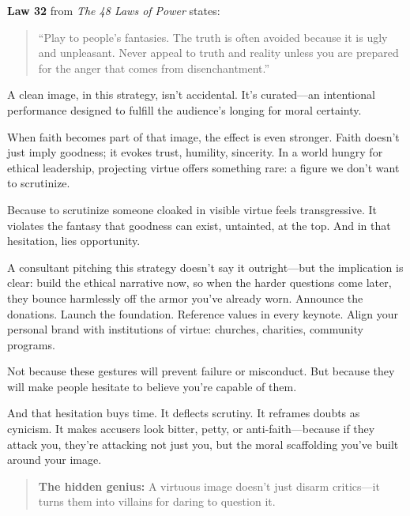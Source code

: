 \begin{tcolorbox}[colback=blue!5!white, colframe=blue!50!black, breakable, title={Psychological Sidebar: Law 32 --- Play to people's fantasies}]

\textbf{Law 32} from \textit{The 48 Laws of Power} states:

\begin{quote}
``Play to people's fantasies. The truth is often avoided because it is ugly and unpleasant. Never appeal to truth and reality unless you are prepared for the anger that comes from disenchantment.''
\end{quote}

A clean image, in this strategy, isn’t accidental. It’s curated—an intentional performance designed to fulfill the audience’s longing for moral certainty.

\medskip

When faith becomes part of that image, the effect is even stronger. Faith doesn’t just imply goodness; it evokes trust, humility, sincerity. In a world hungry for ethical leadership, projecting virtue offers something rare: a figure we don’t want to scrutinize.

\medskip

Because to scrutinize someone cloaked in visible virtue feels transgressive. It violates the fantasy that goodness can exist, untainted, at the top. And in that hesitation, lies opportunity.

\medskip

A consultant pitching this strategy doesn’t say it outright—but the implication is clear: build the ethical narrative now, so when the harder questions come later, they bounce harmlessly off the armor you’ve already worn. Announce the donations. Launch the foundation. Reference values in every keynote. Align your personal brand with institutions of virtue: churches, charities, community programs.

\medskip

Not because these gestures will prevent failure or misconduct. But because they will make people hesitate to believe you’re capable of them.

\medskip

And that hesitation buys time. It deflects scrutiny. It reframes doubts as cynicism. It makes accusers look bitter, petty, or anti-faith—because if they attack you, they’re attacking not just you, but the moral scaffolding you’ve built around your image.

\begin{quote}
\textbf{The hidden genius:} A virtuous image doesn’t just disarm critics—it turns them into villains for daring to question it.
\end{quote}


\end{tcolorbox}
